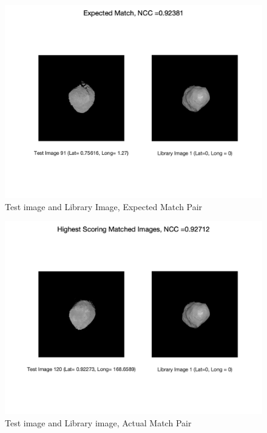 \begin{figure}[h!]
\centering
    \includegraphics[height=0.43\textheight]{fig/expected_match.png}
    \caption{Test image and Library Image, Expected Match Pair}
    \label{fig:expected}
\end{figure}
\begin{figure}[h!]
    \centering
    \includegraphics[height=0.43\textheight]{fig/highest_score.png}
    \caption{Test image and Library image, Actual Match Pair}
    \label{fig:highest}
\end{figure}

